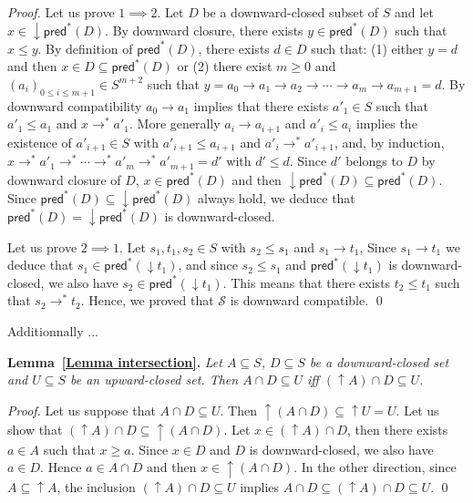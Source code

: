 \documentclass[runningheads]{llncs}
\newcommand{\pred}{\textsf{pred}}
\begin{document}
\begin{proof}
Let us prove $1 \implies 2$. 
Let $D$ be a downward-closed subset of $S$
and let $x \in \mathop{\downarrow} \pred^*(D)$.
By downward closure, there exists
$y \in \pred^*(D)$ 
such that $x \leq y$.
By definition of $\pred^*(D)$, there exists 
$d \in D$ such that: (1) either $y=d$ and then $x \in D \subseteq \pred^*(D)$ or (2) there exist $m\geq 0$ and $(a_i)_{0 \leq i \leq m+1} \in S^{m+2}$ such that
$y = a_0 \to a_1 \to a_2 \to \cdots \to a_m \to a_{m+1} = d$.
%
By downward compatibility $a_0 \to a_1$
implies that there exists $a'_1 \in S$ such that $a'_1 \leq a_1$ and
$x \to^* a'_1$.
More generally $a_i \to a_{i+1}$ and
$a'_i\leq a_i$ implies the existence of $a'_{i+1} \in S$ with $a'_{i+1} \leq a_{i+1}$ and
$a'_i \to^* a'_{i+1}$,
and, by induction,
 $x \to^* a'_1 \to^* \cdots \to^* a'_{m} \to^* a'_{m+1} = d'$
with $d' \leq d$.
Since
$d'$ 
belongs to $D$ by downward closure of $D$, $x \in \pred^*(D)$ and then $\mathop{\downarrow}\pred^*(D) \subseteq \pred^*(D)$. Since $\pred^*(D) \subseteq \mathop{\downarrow} \pred^*(D)$ always hold, we deduce that $\pred^*(D)=\mathop{\downarrow}\pred^*(D)$ is downward-closed.

Let us prove $2 \implies 1$. Let $s_1, t_1 , s_2 \in S$ with $s_2 \leq s_1$  and $s_1 \rightarrow t_1$, Since $s_1 \rightarrow t_1$ we deduce that $s_1 \in \pred^*(\mathop{\downarrow} t_1)$, and since $s_2 \leq s_1$ and $\pred^*(\mathop{\downarrow} t_1)$ is downward-closed, we also have $s_2 \in \pred^*(\mathop{\downarrow} t_1)$. This means that there exists $t_2 \leq t_1$ such that 
$s_2 \rightarrow^{*} t_2$. Hence, we proved that $\mathscr{S}$ is downward compatible.
\qed
\end{proof}


Additionnally ...

\noindent
\textbf{Lemma~\ref{Lemma intersection}.}
{\em Let $A \subseteq S$, $D \subseteq S$ be a downward-closed set and $U \subseteq S$ be an upward-closed set. 
Then $A \cap D \subseteq U$  iff $ (\mathop{\uparrow}  A) \cap D \subseteq U$.
}


\begin{proof}
Let us suppose that $A \cap D \subseteq U$. Then ${\mathop{\uparrow} (A \cap D)} \subseteq {\mathop{\uparrow} U} = U$.
Let us show that $({\mathop{\uparrow} A}) \cap D \subseteq {\mathop{\uparrow} (A \cap D)}$.
Let $x \in ({\mathop{\uparrow} A}) \cap D$, then there exists $a \in A$ such that $x \geq a$.
Since $x \in D$ and $D$ is downward-closed, we also have $a \in D$.
Hence $a \in A \cap D$ and then $x \in { \mathop{\uparrow} (A \cap D)}$.
In the other direction,
since $A \subseteq {\mathop{\uparrow} A}$, the inclusion
$({\mathop{\uparrow}  A}) \cap D \subseteq U$ implies
$A \cap D \subseteq ({\mathop{\uparrow}  A}) \cap D \subseteq U$. \qed
\end{proof}
\end{document}
